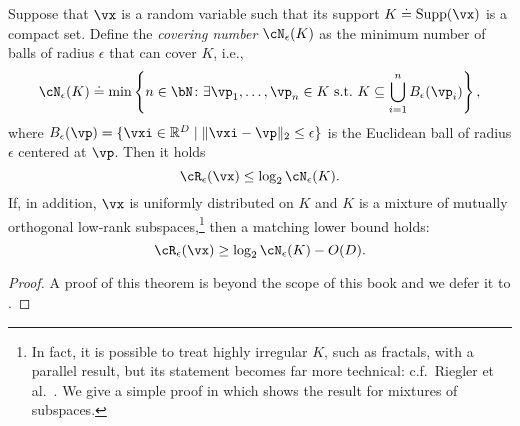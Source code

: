 \documentclass[../../book-main.tex]{subfiles}
\begin{document}
\begin{theorem}\label{thm:covering-number-rate-distortion}
	Suppose that \(\vx\) is a random variable such that its support \(K \doteq \Supp(\vx)\) is a compact set. Define the \textit{covering number} \(\cN_{\epsilon}(K)\) as the minimum number of balls of radius \(\epsilon\) that can cover \(K\), i.e.,
	\begin{equation}
		\cN_{\epsilon}(K) \doteq \min\left\{n \in \bN \colon \exists \vp_{1}, \dots, \vp_{n} \in K\ \text{s.t.}\ K \subseteq \bigcup_{i = 1}^{n}B_{\epsilon}(\vp_{i})\right\},
	\end{equation}
	where \(B_{\epsilon}(\vp) = \set{\vxi\in \R^D \given \norm{\vxi - \vp}_2 \leq
	\epsilon}\) is the Euclidean ball of radius \(\epsilon\) centered at \(\vp\).
	Then it holds 
	\begin{equation}
		\cR_{\epsilon}(\vx) 
		\leq \log_{2} \cN_{\epsilon}(K).
	\end{equation}
	If, in addition, $\vx$ is uniformly distributed on $K$ and $K$ is
	a mixture of mutually orthogonal low-rank subspaces,\footnote{In fact, it is
	possible to treat highly irregular $K$, such as fractals, with a parallel
	result, but its statement
	becomes far more technical: c.f.\ Riegler et al.\
	\cite{Riegler2018-jh,Riegler2023-rr}. We give a simple proof in
	 which shows the result for mixtures of
	subspaces.}
	then a matching lower bound holds:
	\begin{equation}
		\cR_{\epsilon}(\vx)
		\geq
		\log_{2} \cN_{\epsilon}(K) - O(D).
	\end{equation}
\end{theorem}
\begin{proof}
A proof of this theorem is beyond the scope of this book and we defer it to .
\end{proof}

%
\end{document}
